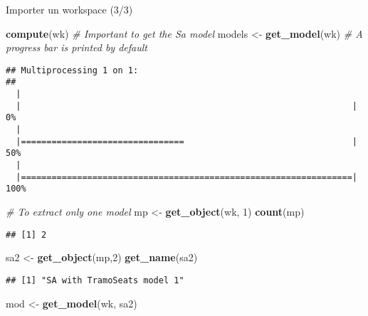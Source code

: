 \documentclass[10pt,xcolor=table,color={dvipsnames,usenames},ignorenonframetext,usepdftitle=false,french]{beamer}
\newenvironment{Shaded}{\begin{snugshade}}{\end{snugshade}}
\newcommand{\CommentTok}[1]{\textcolor[rgb]{0.56,0.35,0.01}{\textit{#1}}}
\newcommand{\DecValTok}[1]{\textcolor[rgb]{0.00,0.00,0.81}{#1}}
\newcommand{\KeywordTok}[1]{\textcolor[rgb]{0.13,0.29,0.53}{\textbf{#1}}}
\newcommand{\NormalTok}[1]{#1}
\newcommand{\StringTok}[1]{\textcolor[rgb]{0.31,0.60,0.02}{#1}}
\begin{document}
\begin{frame}[fragile]{Importer un workspace (3/3)}
\protect\hypertarget{importer-un-workspace-33}{}

\footnotesize

\begin{Shaded}
\begin{Highlighting}[]
\KeywordTok{compute}\NormalTok{(wk) }\CommentTok{# Important to get the Sa model}
\NormalTok{models <-}\StringTok{ }\KeywordTok{get_model}\NormalTok{(wk) }\CommentTok{# A progress bar is printed by default}
\end{Highlighting}
\end{Shaded}

\begin{verbatim}
## Multiprocessing 1 on 1:
## 
  |                                                                       
  |                                                                 |   0%
  |                                                                       
  |================================                                 |  50%
  |                                                                       
  |=================================================================| 100%
\end{verbatim}

\begin{Shaded}
\begin{Highlighting}[]
\CommentTok{# To extract only one model}
\NormalTok{mp <-}\StringTok{ }\KeywordTok{get_object}\NormalTok{(wk, }\DecValTok{1}\NormalTok{)}
\KeywordTok{count}\NormalTok{(mp)}
\end{Highlighting}
\end{Shaded}

\begin{verbatim}
## [1] 2
\end{verbatim}

\begin{Shaded}
\begin{Highlighting}[]
\NormalTok{sa2 <-}\StringTok{ }\KeywordTok{get_object}\NormalTok{(mp,}\DecValTok{2}\NormalTok{)}
\KeywordTok{get_name}\NormalTok{(sa2)}
\end{Highlighting}
\end{Shaded}

\begin{verbatim}
## [1] "SA with TramoSeats model 1"
\end{verbatim}

\begin{Shaded}
\begin{Highlighting}[]
\NormalTok{mod <-}\StringTok{ }\KeywordTok{get_model}\NormalTok{(wk, sa2)}
\end{Highlighting}
\end{Shaded}


\end{frame}
\end{document}
